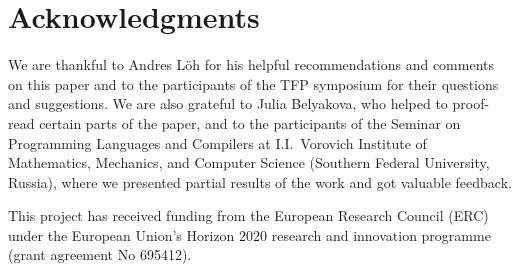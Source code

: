 \documentclass[runningheads]{llncs}
\begin{document}
\section*{Acknowledgments}
\label{sec:acks}

We are thankful to Andres L\"{o}h for his helpful recommendations and comments on this paper and to the participants of the TFP symposium for their questions and suggestions. We are also grateful to Julia Belyakova, who helped to proof-read certain parts of the paper, 
and to the participants of the Seminar on Programming Languages and Compilers at 
I.I.~Vorovich Institute of Mathematics, Mechanics, and Computer Science (Southern Federal
University, Russia), where we presented partial results of the work and got valuable feedback.

This project has received funding from the European Research Council (ERC) under the
European Union's Horizon 2020 research and innovation programme (grant agreement No 695412).

%
%
%


%
\end{document}
